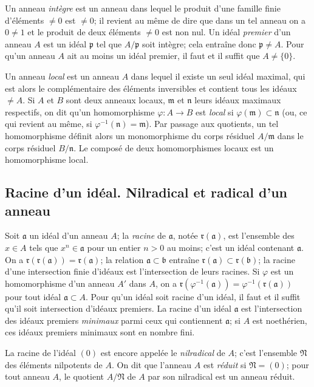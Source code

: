 \begin{env}[1.0.6]
\label{0.1.0.6-fr}
Un anneau \emph{intègre} est un anneau dans lequel le produit d'une famille finie d'éléments $\neq 0$ est $\neq 0$; il revient au même de dire que dans un tel anneau on a $0\neq 1$ et le produit de deux éléments $\neq 0$ est non nul.
Un idéal \emph{premier} d'un anneau $A$ est un idéal $\mathfrak{p}$ tel que $A/\mathfrak{p}$ soit intègre; cela entraîne donc $\mathfrak{p}\neq A$.
Pour qu'un anneau $A$ ait au moins un idéal premier, il faut et il suffit que $A\neq\{0\}$.
\end{env}

\begin{env}[1.0.7]
\label{0.1.0.7-fr}
Un anneau \emph{local} est un anneau $A$ dans lequel il existe un seul idéal maximal, qui est alors le complémentaire des éléments inversibles et contient tous les idéaux $\neq A$.
Si $A$ et $B$ sont deux anneaux locaux, $\mathfrak{m}$ et $\mathfrak{n}$ leurs idéaux maximaux respectifs, on dit qu'un homomorphisme $\varphi:A\to B$ est \emph{local} si $\varphi(\mathfrak{m})\subset\mathfrak{n}$ (ou, ce qui revient au même, si $\varphi^{-1}(\mathfrak{n})=\mathfrak{m}$).
Par passage aux quotients, un tel homomorphisme définit alors un monomorphisme du corps résiduel $A/\mathfrak{m}$ dans le corps résiduel $B/\mathfrak{n}$.
Le composé de deux homomorphismes locaux est un homomorphisme local.
\end{env}

\subsection{Racine d'un idéal. Nilradical et radical d'un anneau}
\label{subsection:0.1.1-fr}

\begin{env}[1.1.1]
\label{0.1.1.1-fr}
Soit $\mathfrak{a}$ un idéal d'un anneau $A$; la \emph{racine} de $\mathfrak{a}$, notée $\mathfrak{r}(\mathfrak{a})$, est l'ensemble des $x\in A$ tels que $x^n\in\mathfrak{a}$ pour un entier $n>0$ au moins; c'est un idéal contenant $\mathfrak{a}$.
On a $\mathfrak{r}(\mathfrak{r}(\mathfrak{a}))=\mathfrak{r}(\mathfrak{a})$; la relation $\mathfrak{a}\subset\mathfrak{b}$ entraîne $\mathfrak{r}(\mathfrak{a})\subset\mathfrak{r}(\mathfrak{b})$; la racine d'une intersection finie d'idéaux est l'intersection de leurs racines.
Si $\varphi$ est un homomorphisme d'un anneau $A'$ dans $A$, on a $\mathfrak{r}(\varphi^{-1}(\mathfrak{a}))=\varphi^{-1}(\mathfrak{r}(\mathfrak{a}))$ pour tout idéal $\mathfrak{a}\subset A$.
Pour qu'un idéal soit racine d'un idéal, il faut et il suffit qu'il soit intersection d'idéaux premiers.
La racine d'un idéal $\mathfrak{a}$ est l'intersection des idéaux premiers \emph{minimaux} parmi ceux qui contiennent $\mathfrak{a}$; si $A$ est noethérien, ces idéaux premiers minimaux sont en nombre fini.

La racine de l'idéal $(0)$ est encore appelée le \emph{nilradical} de $A$; c'est l'ensemble $\mathfrak{N}$ des éléments nilpotents de $A$.
On dit que l'anneau $A$ est \emph{réduit} si $\mathfrak{N}=(0)$; pour tout anneau $A$, le quotient $A/\mathfrak{N}$ de $A$ par son nilradical est un anneau réduit.
\end{env}

